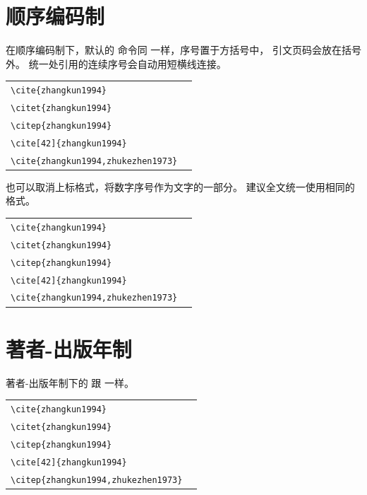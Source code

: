 \section{顺序编码制}

在顺序编码制下，默认的  命令同  一样，序号置于方括号中，
引文页码会放在括号外。
统一处引用的连续序号会自动用短横线连接。

\begin{tabular}{l@{\quad$\Rightarrow$\quad}l}
  \verb|\cite{zhangkun1994}|               & \cite{zhangkun1994}               \\
  \verb|\citet{zhangkun1994}|              & \citet{zhangkun1994}              \\
  \verb|\citep{zhangkun1994}|              & \citep{zhangkun1994}              \\
  \verb|\cite[42]{zhangkun1994}|           & \cite[42]{zhangkun1994}           \\
  \verb|\cite{zhangkun1994,zhukezhen1973}| & \cite{zhangkun1994,zhukezhen1973} \\
\end{tabular}


也可以取消上标格式，将数字序号作为文字的一部分。
建议全文统一使用相同的格式。

\begin{tabular}{l@{\quad$\Rightarrow$\quad}l}
  \verb|\cite{zhangkun1994}|               & \cite{zhangkun1994}               \\
  \verb|\citet{zhangkun1994}|              & \citet{zhangkun1994}              \\
  \verb|\citep{zhangkun1994}|              & \citep{zhangkun1994}              \\
  \verb|\cite[42]{zhangkun1994}|           & \cite[42]{zhangkun1994}           \\
  \verb|\cite{zhangkun1994,zhukezhen1973}| & \cite{zhangkun1994,zhukezhen1973} \\
\end{tabular}



\section{著者-出版年制}

著者-出版年制下的  跟  一样。

\begin{tabular}{l@{\space$\Rightarrow$\space}l}
  \verb|\cite{zhangkun1994}|                & \cite{zhangkun1994}                \\
  \verb|\citet{zhangkun1994}|               & \citet{zhangkun1994}               \\
  \verb|\citep{zhangkun1994}|               & \citep{zhangkun1994}               \\
  \verb|\cite[42]{zhangkun1994}|            & \cite[42]{zhangkun1994}            \\
  \verb|\citep{zhangkun1994,zhukezhen1973}| & \citep{zhangkun1994,zhukezhen1973} \\
\end{tabular}

